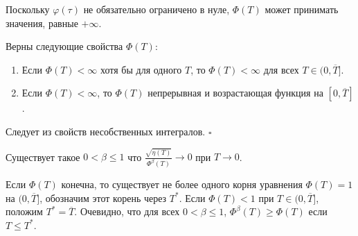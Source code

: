 \documentclass[../main.tex]{subfiles}
\begin{document}
Поскольку $\varphi(\tau)$ не обязательно ограничено в нуле, $\Phi(T)$ может принимать значения, равные $+\infty$.
\begin{lemma}%
Верны следующие свойства $\Phi(T)$:
\begin{enumerate}
 \item Если $\Phi(T) < \infty $ хотя бы для одного $T$, то $\Phi(T) < \infty $ для всех $T \in (0, \overline{T}]$.
\item Если $\Phi(T) < \infty $, то $\Phi(T)$ непрерывная и возрастающая функция на $ [0,\overline{T}]$.
 \end{enumerate}
\end{lemma}
\doc 
Следует из свойств несобственных интегралов. \hfill $ \square $
\begin{assumption}\label{s22:asm2}
Существует такое $ 0 < \beta \leqslant 1$ что $\frac{\sqrt{\eta(T)}}{\Phi^\beta(T)} \to 0$ при $T \to 0$.
\end{assumption}
Если $\Phi(T)$ конечна, то существует не более одного корня уравнения $\Phi(T)=1$ на $(0,\overline{T}]$, обозначим этот корень через $T^*$. 
Если $\Phi(T)<1$ при $T\in (0,\overline{T}]$, положим $T^*=\overline{T}$. 
Очевидно, что для всех $ 0 < \beta \leqslant 1$, $\Phi^\beta(T)\geqslant \Phi(T)$ если $T \leqslant T^*$.
\end{document}
